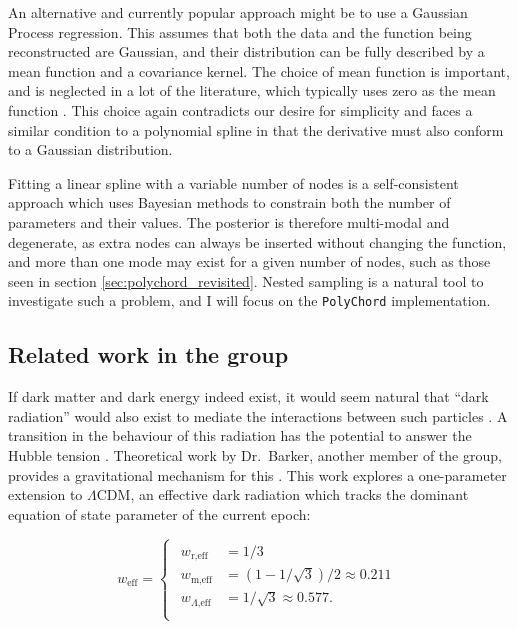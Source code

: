 \documentclass{article}
\begin{document}
An alternative and currently popular approach might be to use a Gaussian Process regression. This assumes that both the data and the function being reconstructed are Gaussian, and their distribution can be fully described by a mean function and a covariance kernel. The choice of mean function is important, and is neglected in a lot of the literature, which typically uses zero as the mean function \cite{GP}. This choice again contradicts our desire for simplicity and faces a similar condition to a polynomial spline in that the derivative must also conform to a Gaussian distribution.

Fitting a linear spline with a variable number of nodes is a self-consistent approach which uses Bayesian methods to constrain both the number of parameters and their values. The posterior is therefore multi-modal and degenerate, as extra nodes can always be inserted without changing the function, and more than one mode may exist for a given number of nodes, such as those seen in section \ref{sec:polychord_revisited}. Nested sampling is a natural tool to investigate such a problem, and I will focus on the \texttt{PolyChord} implementation.

\subsection{Related work in the group}
\label{sec:barker}
If dark matter and dark energy indeed exist, it would seem natural that ``dark radiation'' would also exist to mediate the interactions between such particles \cite{Ackerman_2009}. A transition in the behaviour of this radiation has the potential to answer the Hubble tension \cite{Aloni_2022}. Theoretical work by Dr.~Barker, another member of the group, provides a gravitational mechanism for this \cite{Barker_2020}. This work explores a one-parameter extension to $\Lambda$CDM, an effective dark radiation which tracks the dominant equation of state parameter of the current epoch: 

\begin{equation}
  \label{eq:dark-barker}
  w_\textrm{eff} = 
  \begin{cases}
    \begin{aligned}
      w_\textrm{r,eff} &= 1/3 \\
      w_\textrm{m,eff} &= (1-1/\sqrt{3}) / 2 \approx 0.211 \\
      w_{\Lambda \textrm{,eff}} &= 1/\sqrt{3} \approx 0.577 \textrm{.} \\
    \end{aligned}
  \end{cases}
\end{equation}
\end{document}
